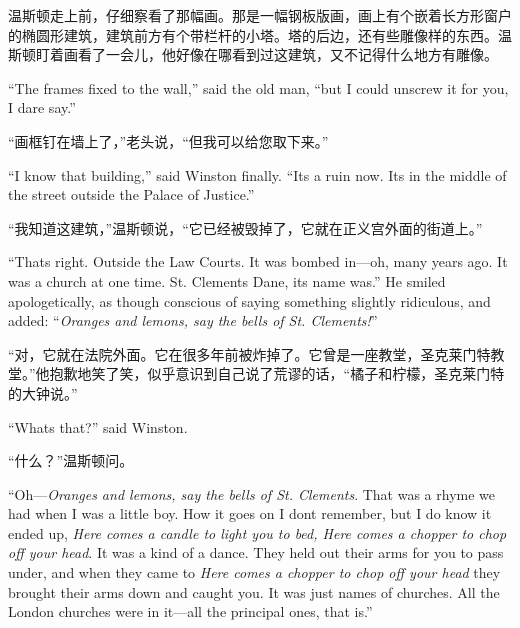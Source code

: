 \begin{paracol}{2}
\switchcolumn

温斯顿走上前，仔细察看了那幅画。那是一幅钢板版画，画上有个嵌着长方形窗户的椭圆形建筑，建筑前方有个带栏杆的小塔。塔的后边，还有些雕像样的东西。温斯顿盯着画看了一会儿，他好像在哪看到过这建筑，又不记得什么地方有雕像。

\switchcolumn*

``The frame\textquotesingle s fixed to the wall,'' said the old man, ``but
I could unscrew it for you, I dare say.''

\switchcolumn

``画框钉在墙上了，''老头说，``但我可以给您取下来。''

\switchcolumn*

``I know that building,'' said Winston finally. ``It\textquotesingle s a
ruin now. It\textquotesingle s in the middle of the street outside the
Palace of Justice.''

\switchcolumn

``我知道这建筑，''温斯顿说，``它已经被毁掉了，它就在正义宫外面的街道上。''

\switchcolumn*

``That\textquotesingle s right. Outside the Law Courts. It was bombed
in---oh, many years ago. It was a church at one time. St.
Clement\textquotesingle s Dane, its name was.'' He smiled apologetically,
as though conscious of saying something slightly ridiculous, and added:
``\emph{Oranges and lemons, say the bells of St.
Clement\textquotesingle s!}''

\switchcolumn

``对，它就在法院外面。它在很多年前被炸掉了。它曾是一座教堂，圣克莱门特教堂。''他抱歉地笑了笑，似乎意识到自己说了荒谬的话，``橘子和柠檬，圣克莱门特的大钟说。''

\switchcolumn*

``What\textquotesingle s that?'' said Winston.

\switchcolumn

``什么？''温斯顿问。

\switchcolumn*

``Oh---\emph{Oranges and lemons, say the bells of St.
Clement\textquotesingle s}. That was a rhyme we had when I was a little
boy. How it goes on I don\textquotesingle t remember, but I do know it
ended up, \emph{Here comes a candle to light you to bed, Here comes a
chopper to chop off your head}. It was a kind of a dance. They held out
their arms for you to pass under, and when they came to \emph{Here comes
a chopper to chop off your head} they brought their arms down and caught
you. It was just names of churches. All the London churches were in
it---all the principal ones, that is.''


\end{paracol}
